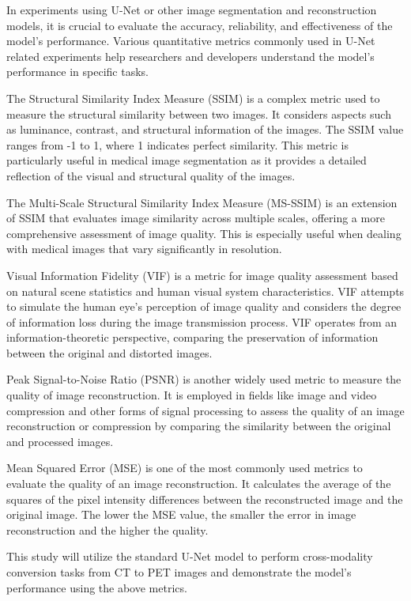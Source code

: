 \documentclass[twocolumn]{article}
\begin{document}
In experiments using U-Net or other image segmentation and reconstruction models, it is crucial to evaluate the accuracy, reliability, and effectiveness of the model's performance. Various quantitative metrics commonly used in U-Net related experiments help researchers and developers understand the model's performance in specific tasks.

The Structural Similarity Index Measure (SSIM) is a complex metric used to measure the structural similarity between two images. It considers aspects such as luminance, contrast, and structural information of the images. The SSIM value ranges from -1 to 1, where 1 indicates perfect similarity. This metric is particularly useful in medical image segmentation as it provides a detailed reflection of the visual and structural quality of the images.

The Multi-Scale Structural Similarity Index Measure (MS-SSIM) is an extension of SSIM that evaluates image similarity across multiple scales, offering a more comprehensive assessment of image quality. This is especially useful when dealing with medical images that vary significantly in resolution.

Visual Information Fidelity (VIF) is a metric for image quality assessment based on natural scene statistics and human visual system characteristics. VIF attempts to simulate the human eye's perception of image quality and considers the degree of information loss during the image transmission process. VIF operates from an information-theoretic perspective, comparing the preservation of information between the original and distorted images.

Peak Signal-to-Noise Ratio (PSNR) is another widely used metric to measure the quality of image reconstruction. It is employed in fields like image and video compression and other forms of signal processing to assess the quality of an image reconstruction or compression by comparing the similarity between the original and processed images.

Mean Squared Error (MSE) is one of the most commonly used metrics to evaluate the quality of an image reconstruction. It calculates the average of the squares of the pixel intensity differences between the reconstructed image and the original image. The lower the MSE value, the smaller the error in image reconstruction and the higher the quality.

This study will utilize the standard U-Net model to perform cross-modality conversion tasks from CT to PET images and demonstrate the model's performance using the above metrics.
\end{document}
